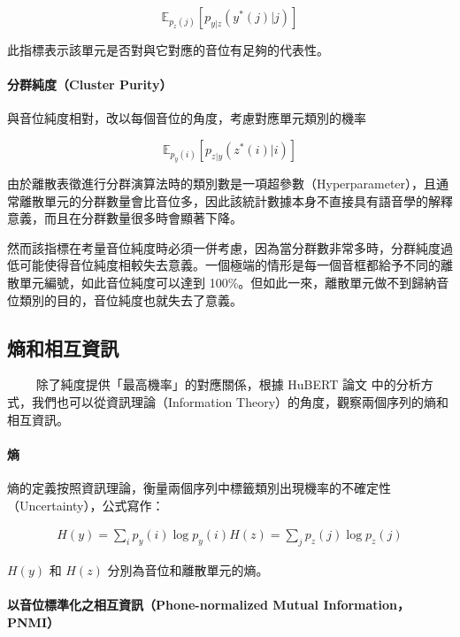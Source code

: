 \newcommand{\E}{\mathbb{E}}

$$\E_{p_z(j)}\left[p_{y|z}(y^*(j)|j) \right]$$

此指標表示該單元是否對與它對應的音位有足夠的代表性。

\paragraph{分群純度（Cluster Purity）}
與音位純度相對，改以每個音位的角度，考慮對應單元類別的機率

$$\E_{p_y(i)}\left[p_{z|y}(z^*(i)|i) \right]$$

由於離散表徵進行分群演算法時的類別數是一項超參數（Hyperparameter），且通常離散單元的分群數量會比音位多，因此該統計數據本身不直接具有語音學的解釋意義，而且在分群數量很多時會顯著下降。

然而該指標在考量音位純度時必須一併考慮，因為當分群數非常多時，分群純度過低可能使得音位純度相較失去意義。一個極端的情形是每一個音框都給予不同的離散單元編號，如此音位純度可以達到 100\%。但如此一來，離散單元做不到歸納音位類別的目的，音位純度也就失去了意義。





\subsection{熵和相互資訊}
　　
除了純度提供「最高機率」的對應關係，根據 HuBERT 論文 \cite{hsu_hubert_2021-2} 中的分析方式，我們也可以從資訊理論（Information Theory）的角度，觀察兩個序列的熵和相互資訊。

\paragraph{熵}

熵的定義按照資訊理論，衡量兩個序列中標籤類別出現機率的不確定性（Uncertainty），公式寫作：

\begin{align}
    H(y) = \sum_i{p_y(i)\log p_y(i)}
    H(z) = \sum_j{p_z(j)\log p_z(j)}
\end{align}

$H(y)$ 和 $H(z)$ 分別為音位和離散單元的熵。

\paragraph{以音位標準化之相互資訊（Phone-normalized Mutual Information，PNMI）}

